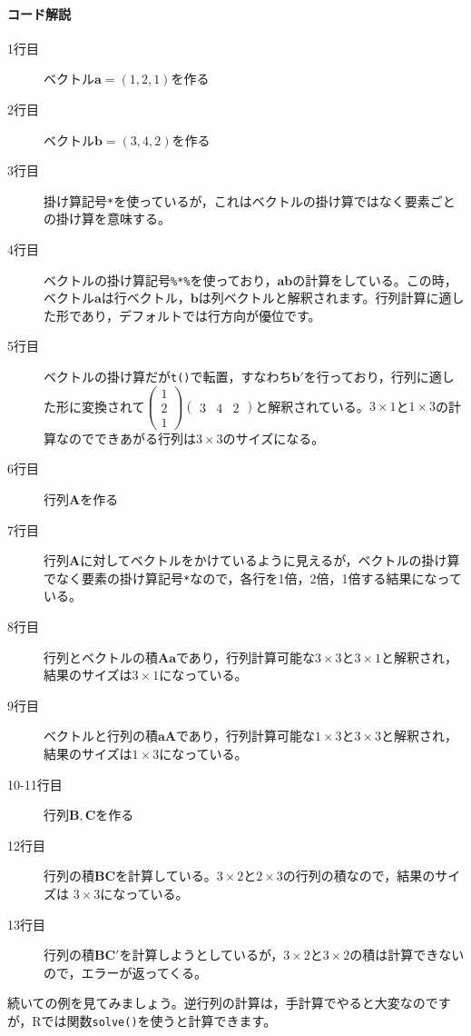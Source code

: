 \documentclass{ltjsbook}
\begin{document}
\paragraph{コード解説}
\begin{description}
	\item[1行目] ベクトル$\bm{a}=(1,2,1)$を作る
	\item[2行目] ベクトル$\bm{b}=(3,4,2)$を作る
	\item[3行目] 掛け算記号\verb|*|を使っているが，これはベクトルの掛け算ではなく要素ごとの掛け算を意味する。
	\item[4行目] ベクトルの掛け算記号\verb|%*%|を使っており，$\bm{ab}$の計算をしている。この時，ベクトル$\bm{a}$は行ベクトル，$\bm{b}$は列ベクトルと解釈されます。行列計算に適した形であり，デフォルトでは行方向が優位です。
	\item[5行目] ベクトルの掛け算だが\texttt{t()}で転置，すなわち$\bm{b}'$を行っており，行列に適した形に変換されて$\begin{pmatrix}1\\2\\1\end{pmatrix}\begin{pmatrix}3&4&2\end{pmatrix}$と解釈されている。$3\times1$と$1\times3$の計算なのでできあがる行列は$3\times3$のサイズになる。
	\item[6行目] 行列$\bm{A}$を作る
	\item[7行目] 行列$\bm{A}$に対してベクトルをかけているように見えるが，ベクトルの掛け算でなく要素の掛け算記号\verb|*|なので，各行を1倍，2倍，1倍する結果になっている。
	\item[8行目] 行列とベクトルの積$\bm{Aa}$であり，行列計算可能な$3\times3$と$3\times1$と解釈され，結果のサイズは$3 \times 1$になっている。
	\item[9行目] ベクトルと行列の積$\bm{aA}$であり，行列計算可能な$1 \times 3$と$3 \times 3$と解釈され，結果のサイズは$1 \times 3$になっている。
	\item[10-11行目] 行列$\bm{B,C}$を作る
	\item[12行目] 行列の積$\bm{BC}$を計算している。$3\times2$と$2\times3$の行列の積なので，結果のサイズは $3\times3$になっている。
	\item[13行目] 行列の積$\bm{BC'}$を計算しようとしているが，$3\times2$と$3\times2$の積は計算できないので，エラーが返ってくる。
\end{description}

続いての例を見てみましょう。逆行列の計算は，手計算でやると大変なのですが，Rでは関数\texttt{solve()}を使うと計算できます。
\end{document}
